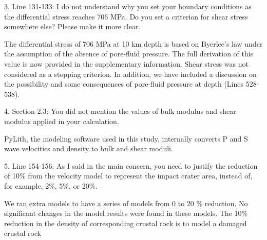 \documentclass[12pt]{article}
\begin{document}
\begin{response}{3. Line 131-133: I do not understand why you set your boundary conditions as the differential stress reaches 706 MPa. Do you set a criterion for shear stress somewhere else? Please make it more clear.}

  The differential stress of 706 MPa at 10 km depth is based on Byerlee's law under the assumption of   the absence of pore-fluid pressure. The full derivation of this value is now provided in the supplementary information. Shear stress was not considered as a stopping criterion. In addition, we have included a discussion on the possibility and some consequences of pore-fluid pressure at depth (Lines 528-538).
  
\end{response}

\begin{response}{4. Section 2.3: You did not mention the values of bulk modulus and shear modulus applied in your calculation.}

  PyLith, the modeling software used in this study, internally converts P and S wave velocities and density to bulk and shear moduli. 
\end{response}

\begin{response}{5. Line 154-156: As I said in the main concern, you need to justify the reduction of 10\% from the velocity model to represent the impact crater area, instead of, for example, 2\%, 5\%, or 20\%.}

  We ran extra models to have a series of models from 0 to 20 \% reduction. No significant changes in the model results were found in these models. The 10\% reduction in the density of corresponding crustal rock is to model a  damaged crustal rock 
\end{response}
\end{document}
